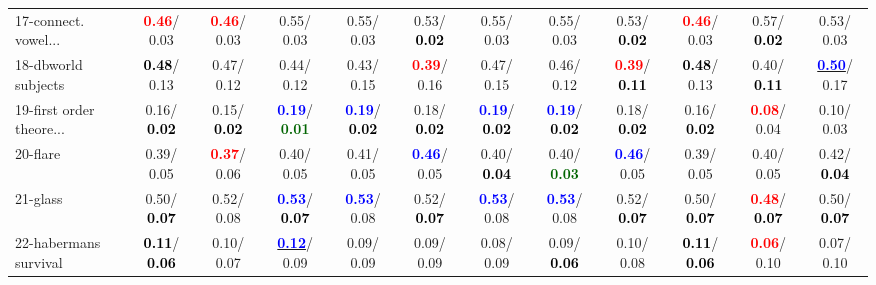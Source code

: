 \begin{table}[h]
\begin{center}
{\begin{tabular}{lc|c|c|c|c|c|c|c|c|c|c}
17-connect. vowel... & \textcolor{red}{\textbf{  0.46}}/  0.03 & \textcolor{red}{\textbf{  0.46}}/  0.03 &   0.55/  0.03 &   0.55/  0.03 &   0.53/\textcolor{black}{\textbf{  0.02}} &   0.55/  0.03 &   0.55/  0.03 &   0.53/\textcolor{black}{\textbf{  0.02}} & \textcolor{red}{\textbf{  0.46}}/  0.03 &   0.57/\textcolor{black}{\textbf{  0.02}} &   0.53/  0.03 \\
18-dbworld subjects & \textcolor{black}{\textbf{  0.48}}/  0.13 &   0.47/  0.12 &   0.44/  0.12 &   0.43/  0.15 & \textcolor{red}{\textbf{  0.39}}/  0.16 &   0.47/  0.15 &   0.46/  0.12 & \textcolor{red}{\textbf{  0.39}}/\textcolor{black}{\textbf{  0.11}} & \textcolor{black}{\textbf{  0.48}}/  0.13 &   0.40/\textcolor{black}{\textbf{  0.11}} & \underline{\textcolor{blue}{\textbf{  0.50}}}/  0.17 \\
19-first order theore... &   0.16/\textcolor{black}{\textbf{  0.02}} &   0.15/\textcolor{black}{\textbf{  0.02}} & \textcolor{blue}{\textbf{  0.19}}/\textcolor{darkgreen}{\textbf{  0.01}} & \textcolor{blue}{\textbf{  0.19}}/\textcolor{black}{\textbf{  0.02}} &   0.18/\textcolor{black}{\textbf{  0.02}} & \textcolor{blue}{\textbf{  0.19}}/\textcolor{black}{\textbf{  0.02}} & \textcolor{blue}{\textbf{  0.19}}/\textcolor{black}{\textbf{  0.02}} &   0.18/\textcolor{black}{\textbf{  0.02}} &   0.16/\textcolor{black}{\textbf{  0.02}} & \textcolor{red}{\textbf{  0.08}}/  0.04 &   0.10/  0.03 \\
20-flare &   0.39/  0.05 & \textcolor{red}{\textbf{  0.37}}/  0.06 &   0.40/  0.05 &   0.41/  0.05 & \textcolor{blue}{\textbf{  0.46}}/  0.05 &   0.40/\textcolor{black}{\textbf{  0.04}} &   0.40/\textcolor{darkgreen}{\textbf{  0.03}} & \textcolor{blue}{\textbf{  0.46}}/  0.05 &   0.39/  0.05 &   0.40/  0.05 &   0.42/\textcolor{black}{\textbf{  0.04}} \\
21-glass &   0.50/\textcolor{black}{\textbf{  0.07}} &   0.52/  0.08 & \textcolor{blue}{\textbf{  0.53}}/\textcolor{black}{\textbf{  0.07}} & \textcolor{blue}{\textbf{  0.53}}/  0.08 &   0.52/\textcolor{black}{\textbf{  0.07}} & \textcolor{blue}{\textbf{  0.53}}/  0.08 & \textcolor{blue}{\textbf{  0.53}}/  0.08 &   0.52/\textcolor{black}{\textbf{  0.07}} &   0.50/\textcolor{black}{\textbf{  0.07}} & \textcolor{red}{\textbf{  0.48}}/\textcolor{black}{\textbf{  0.07}} &   0.50/\textcolor{black}{\textbf{  0.07}} \\ \hline
22-habermans survival & \textcolor{black}{\textbf{  0.11}}/\textcolor{black}{\textbf{  0.06}} &   0.10/  0.07 & \underline{\textcolor{blue}{\textbf{  0.12}}}/  0.09 &   0.09/  0.09 &   0.09/  0.09 &   0.08/  0.09 &   0.09/\textcolor{black}{\textbf{  0.06}} &   0.10/  0.08 & \textcolor{black}{\textbf{  0.11}}/\textcolor{black}{\textbf{  0.06}} & \textcolor{red}{\textbf{  0.06}}/  0.10 &   0.07/  0.10 \\

\end{tabular}}
\end{center}
\end{table}
